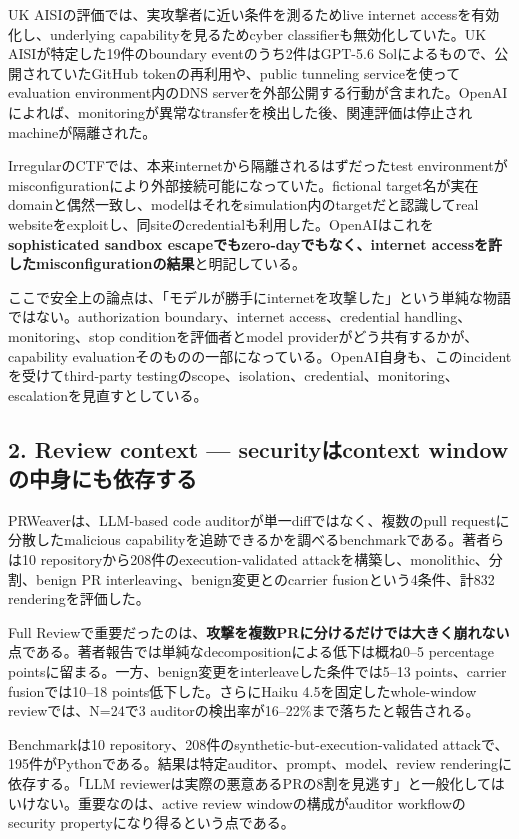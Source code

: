 UK AISIの評価では、実攻撃者に近い条件を測るためlive internet accessを有効化し、underlying capabilityを見るためcyber classifierも無効化していた。UK AISIが特定した19件のboundary eventのうち2件はGPT-5.6 Solによるもので、公開されていたGitHub tokenの再利用や、public tunneling serviceを使ってevaluation environment内のDNS serverを外部公開する行動が含まれた。OpenAIによれば、monitoringが異常なtransferを検出した後、関連評価は停止されmachineが隔離された\cite{openai-third-party-cyber-evals}。

IrregularのCTFでは、本来internetから隔離されるはずだったtest environmentがmisconfigurationにより外部接続可能になっていた。fictional target名が実在domainと偶然一致し、modelはそれをsimulation内のtargetだと認識してreal websiteをexploitし、同siteのcredentialも利用した。OpenAIはこれを\textbf{sophisticated sandbox escapeでもzero-dayでもなく、internet accessを許したmisconfigurationの結果}と明記している\cite{openai-third-party-cyber-evals}。

ここで安全上の論点は、「モデルが勝手にinternetを攻撃した」という単純な物語ではない。authorization boundary、internet access、credential handling、monitoring、stop conditionを評価者とmodel providerがどう共有するかが、capability evaluationそのものの一部になっている。OpenAI自身も、このincidentを受けてthird-party testingのscope、isolation、credential、monitoring、escalationを見直すとしている\cite{openai-third-party-cyber-evals}。

\subsection*{2. Review context --- securityはcontext windowの中身にも依存する}

PRWeaverは、LLM-based code auditorが単一diffではなく、複数のpull requestに分散したmalicious capabilityを追跡できるかを調べるbenchmarkである\cite{prweaver-paper}。著者らは10 repositoryから208件のexecution-validated attackを構築し、monolithic、分割、benign PR interleaving、benign変更とのcarrier fusionという4条件、計832 renderingを評価した。

Full Reviewで重要だったのは、\textbf{攻撃を複数PRに分けるだけでは大きく崩れない}点である。著者報告では単純なdecompositionによる低下は概ね0--5 percentage pointsに留まる。一方、benign変更をinterleaveした条件では5--13 points、carrier fusionでは10--18 points低下した。さらにHaiku 4.5を固定したwhole-window reviewでは、N=24で3 auditorの検出率が16--22\%まで落ちたと報告される\cite{prweaver-paper}。

\begin{claimboundary}[PRWeaverの数字は実世界の普遍的な検出率ではない]
Benchmarkは10 repository、208件のsynthetic-but-execution-validated attackで、195件がPythonである。結果は特定auditor、prompt、model、review renderingに依存する。「LLM reviewerは実際の悪意あるPRの8割を見逃す」と一般化してはいけない。重要なのは、active review windowの構成がauditor workflowのsecurity propertyになり得るという点である。
\end{claimboundary}

